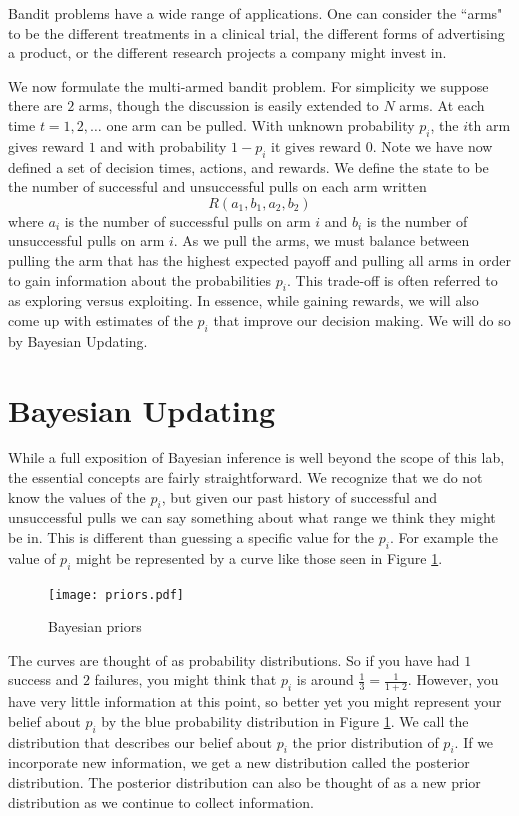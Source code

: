 Bandit problems have a wide range of applications.  
One can consider the ``arms" to be the different treatments in a 
clinical trial, the different forms of advertising a product, 
or the different research projects a company might invest in.

We now formulate the multi-armed bandit problem.  
For simplicity we suppose there are $2$ arms, though the 
discussion is easily extended to $N$ arms.  
At each time $t= 1,2,\ldots$ one arm can be pulled.  
With unknown probability $p_i$, the $i$th arm gives 
reward $1$ and with probability $1-p_i$ it gives reward $0$.  
Note we have now defined a set of decision times, actions, and rewards. 
We define the state to be the number of successful and unsuccessful 
pulls on each arm written
\begin{equation}\label{state}
R(a_1,b_1,a_2,b_2)
\end{equation}
where $a_i$ is the number of successful pulls on arm $i$ and $b_i$ 
is the number of unsuccessful pulls on arm $i$.
As we pull the arms, we must balance between pulling the arm that has 
the highest expected payoff and pulling all arms in order to gain 
information about the probabilities $p_i$.  
This trade-off is often referred to as exploring versus exploiting.  
In essence, while gaining rewards, we will also come up with 
estimates of the $p_i$ that improve our decision making.  
We will do so by Bayesian Updating.

\section*{Bayesian Updating}
While a full exposition of Bayesian inference is well beyond the 
scope of this lab, the essential concepts are fairly straightforward.  
We recognize that we do not know the values of the $p_i$, 
but given our past history of successful and unsuccessful 
pulls we can say something about what range we think they might be in. 
This is different than guessing a specific value for the $p_i$.
For example the value of $p_i$ might be represented by a curve 
like those seen in Figure \ref{fig:priors}.
\begin{figure}

\centering
\texttt{[image: priors.pdf]}
\caption{Bayesian priors}
\label{fig:priors}
\end{figure}
The curves are thought of as probability distributions.  
So if you have had $1$ success and $2$ failures, you might 
think that $p_i$ is around $\frac{1}{3} = \frac{1}{1+2}$. 
However, you have very little information at this point, 
so better yet you might represent your belief about $p_i$ 
by the blue probability distribution in Figure \ref{fig:priors}.  
We call the distribution that describes our belief about $p_i$ 
the prior distribution of $p_i$.  If we incorporate new information, 
we get a new distribution called the posterior distribution.  
The posterior distribution can also be thought of as a new prior 
distribution as we continue to collect information.

